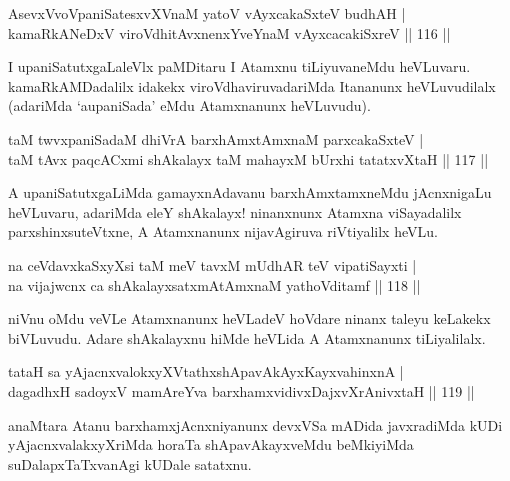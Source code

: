 
\begin{shl}
AsevxVvoVpaniSatesxvXVnaM yatoV vAyxcakaSxteV budhAH |\\
kamaRkANeDxV viroVdhitAvxnenxYveYnaM vAyxcacakiSxreV \hfill || 116 ||
\end{shl}

\begin{artha}
I upaniSatutxgaLaleVlx paMDitaru I Atamxnu tiLiyuvaneMdu heVLuvaru. kamaRkAMDadalilx idakekx viroVdhaviruvadariMda Itananunx heVLuvudilalx (adariMda `aupaniSada' eMdu Atamxnanunx heVLuvudu).
\end{artha}


\begin{shl}
taM twvxpaniSadaM dhiVrA barxhAmxtAmxnaM parxcakaSxteV |\\
taM tAvx paqcACxmi shAkalayx taM mahayxM bUrxhi tatatxvXtaH \hfill || 117 ||
\end{shl}

\begin{artha}
A upaniSatutxgaLiMda gamayxnAdavanu barxhAmxtamxneMdu jAcnxnigaLu heVLuvaru, adariMda eleY shAkalayx! ninanxnunx Atamxna viSayadalilx parxshinxsuteVtxne, A Atamxnanunx nijavAgiruva riVtiyalilx heVLu.
\end{artha}

\begin{shl}
na ceVdavxkaSxyXsi taM meV tavxM mUdhAR teV vipatiSayxti |\\
na vijajwcnx ca shAkalayxsatxmAtAmxnaM yathoVditamf \hfill || 118 ||
\end{shl}

\begin{artha}%
niVnu oMdu veVLe Atamxnanunx heVLadeV hoVdare ninanx taleyu keLakekx biVLuvudu. Adare shAkalayxnu hiMde heVLida A Atamxnanunx tiLiyalilalx.
\end{artha}

\begin{shl}
tataH sa yAjacnxvalokxyXVtathxshApavAkAyxKayxvahinxnA |\\
dagadhxH sadoyxV mamAreYva barxhamxvidivxDajxvXrAnivxtaH \hfill || 119 ||
\end{shl}

\begin{artha}
anaMtara Atanu barxhamxjAcnxniyanunx devxVSa mADida javxradiMda kUDi yAjacnxvalakxyXriMda horaTa shApavAkayxveMdu beMkiyiMda suDalapxTaTxvanAgi kUDale satatxnu.
\end{artha}

